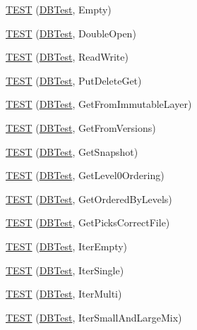 \begin{DoxyCompactItemize}
\item 
\hyperlink{namespaceleveldb_a5cdb2a977033415260acc09b4b1b7171}{T\+E\+S\+T} (\hyperlink{classleveldb_1_1_d_b_test}{D\+B\+Test}, Empty)
\item 
\hyperlink{namespaceleveldb_a3503627f8dbda3abcdc7121ec0ee8793}{T\+E\+S\+T} (\hyperlink{classleveldb_1_1_d_b_test}{D\+B\+Test}, Double\+Open)
\item 
\hyperlink{namespaceleveldb_a2d427ecc9d7b712d8c5dd7ec8b6343fc}{T\+E\+S\+T} (\hyperlink{classleveldb_1_1_d_b_test}{D\+B\+Test}, Read\+Write)
\item 
\hyperlink{namespaceleveldb_a4d273f5f0d313440832363179e28e010}{T\+E\+S\+T} (\hyperlink{classleveldb_1_1_d_b_test}{D\+B\+Test}, Put\+Delete\+Get)
\item 
\hyperlink{namespaceleveldb_a21cac1755bd447df075909132bb964d4}{T\+E\+S\+T} (\hyperlink{classleveldb_1_1_d_b_test}{D\+B\+Test}, Get\+From\+Immutable\+Layer)
\item 
\hyperlink{namespaceleveldb_affd937ddc8c138fd0b5d020a396310c8}{T\+E\+S\+T} (\hyperlink{classleveldb_1_1_d_b_test}{D\+B\+Test}, Get\+From\+Versions)
\item 
\hyperlink{namespaceleveldb_ad6fac95495278565df640d4055b9c9f0}{T\+E\+S\+T} (\hyperlink{classleveldb_1_1_d_b_test}{D\+B\+Test}, Get\+Snapshot)
\item 
\hyperlink{namespaceleveldb_a2b333e6a496f74899c808279627f11a0}{T\+E\+S\+T} (\hyperlink{classleveldb_1_1_d_b_test}{D\+B\+Test}, Get\+Level0\+Ordering)
\item 
\hyperlink{namespaceleveldb_a8f54952904ed501131060691eb1b6970}{T\+E\+S\+T} (\hyperlink{classleveldb_1_1_d_b_test}{D\+B\+Test}, Get\+Ordered\+By\+Levels)
\item 
\hyperlink{namespaceleveldb_ac3d2a0e1b8553c3106c45ead7d6804bb}{T\+E\+S\+T} (\hyperlink{classleveldb_1_1_d_b_test}{D\+B\+Test}, Get\+Picks\+Correct\+File)
\item 
\hyperlink{namespaceleveldb_a5ad106e9bbfcb5520b7dc344525f7cd2}{T\+E\+S\+T} (\hyperlink{classleveldb_1_1_d_b_test}{D\+B\+Test}, Iter\+Empty)
\item 
\hyperlink{namespaceleveldb_a8a6d5f729259c0f357f4dee533a5ce6a}{T\+E\+S\+T} (\hyperlink{classleveldb_1_1_d_b_test}{D\+B\+Test}, Iter\+Single)
\item 
\hyperlink{namespaceleveldb_a683bc77ccfd830fbe21a91c26ac91347}{T\+E\+S\+T} (\hyperlink{classleveldb_1_1_d_b_test}{D\+B\+Test}, Iter\+Multi)
\item 
\hyperlink{namespaceleveldb_a4044ccda7237640864995a0885ea6710}{T\+E\+S\+T} (\hyperlink{classleveldb_1_1_d_b_test}{D\+B\+Test}, Iter\+Small\+And\+Large\+Mix)

\end{DoxyCompactItemize}
